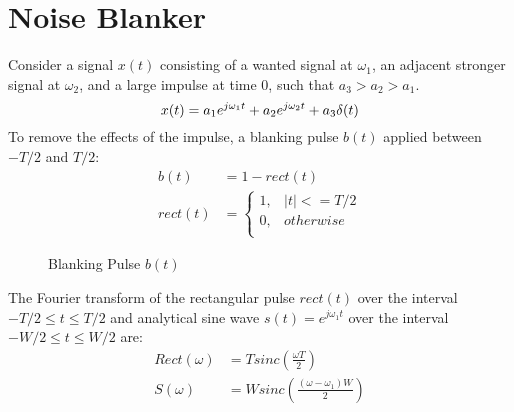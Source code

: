 \documentclass{article}
\begin{document}
\section{Noise Blanker}

Consider a signal $x(t)$ consisting of a wanted signal at $\omega_1$, an adjacent stronger signal at $\omega_2$, and a large impulse at time 0, such that $a_3>a_2>a_1$.
\begin{equation}
x(t) = a_1 e^{j \omega_1 t} + a_2 e^{j \omega_2 t} + a_3\delta(t) \\
\end{equation}
To remove the effects of the impulse, a blanking pulse $b(t)$ applied between $-T/2$ and $T/2$:
\begin{equation}
\begin{split}
b(t) &= 1 - rect(t) \\
rect(t) &= 
	\begin{cases}
      1, & |t| <= T/2 \\
      0, & otherwise \\
	\end{cases}
\end{split}
\end{equation} 

\begin{figure}[h]
\caption{Blanking Pulse $b(t)$ }
\vspace{5mm}
\label{fig:rect_time}
\centering
{}
\end{figure}

The Fourier transform of the rectangular pulse $rect(t)$ over the interval $-T/2 \le t \le T/2$ and analytical sine wave $s(t)=e^{j \omega_1 t}$ over the interval $-W/2 \le t \le W/2$ are:
\begin{equation}
\begin{split}
Rect(\omega) &= T sinc \left( \frac{\omega T}{2} \right)	\\
S(\omega) &= W sinc \left( \frac{(\omega - \omega_1)W}{2} \right)
\end{split}
\end{equation} 
\end{document}
